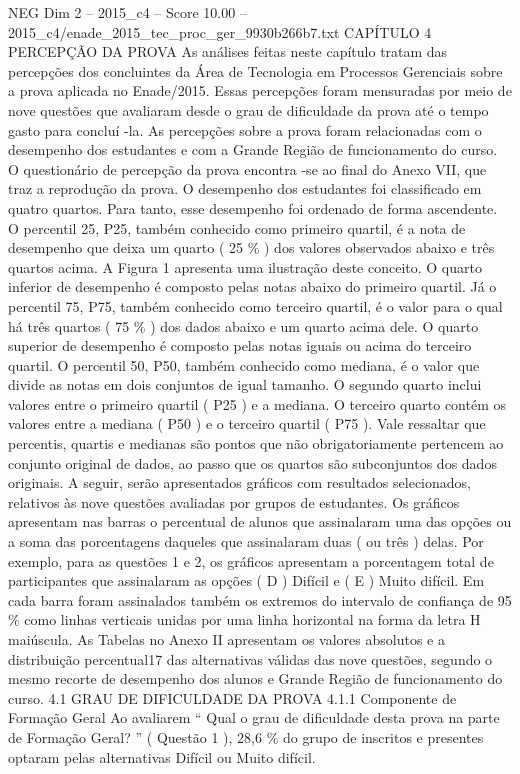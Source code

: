 \begin{textsample}{NEG Dim 2 – 2015\_c4 – Score 10.00 – 2015\_c4/enade\_2015\_tec\_proc\_ger\_9930b266b7.txt}  \label{ex:f2_neg_347}
CAPÍTULO 4 PERCEPÇÃO DA PROVA As análises feitas neste capítulo tratam das percepções dos concluintes da Área de Tecnologia em Processos Gerenciais sobre a prova aplicada no Enade/2015.
Essas percepções foram mensuradas por meio de nove questões que avaliaram desde o grau de dificuldade da prova até o tempo gasto para concluí -la.
As percepções sobre a prova foram relacionadas com o desempenho dos estudantes e com a Grande Região de funcionamento do curso.
O questionário de percepção da prova encontra -se ao final do Anexo VII, que traz a reprodução da prova.
O desempenho dos estudantes foi classificado em quatro quartos.
Para tanto, esse desempenho foi ordenado de forma ascendente.
O percentil 25, P25, também conhecido como primeiro quartil, é a nota de desempenho que deixa um quarto ( 25 \% ) dos valores observados abaixo e três quartos acima.
A Figura 1 apresenta uma ilustração deste conceito.
O quarto inferior de desempenho é composto pelas notas abaixo do primeiro quartil.
Já o percentil 75, P75, também conhecido como terceiro quartil, é o valor para o qual há três quartos ( 75 \% ) dos dados abaixo e um quarto acima dele.
O quarto superior de desempenho é composto pelas notas iguais ou acima do terceiro quartil.
O percentil 50, P50, também conhecido como mediana, é o valor que divide as notas em dois conjuntos de igual tamanho.
O segundo quarto inclui valores entre o primeiro quartil ( P25 ) e a mediana.
O terceiro quarto contém os valores entre a mediana ( P50 ) e o terceiro quartil ( P75 ).
Vale ressaltar que percentis, quartis e medianas são pontos que não obrigatoriamente pertencem ao conjunto original de dados, ao passo que os quartos são subconjuntos dos dados originais.
A seguir, serão apresentados gráficos com resultados selecionados, relativos às nove questões avaliadas por grupos de estudantes.
Os gráficos apresentam nas barras o percentual de alunos que assinalaram uma das opções ou a soma das porcentagens daqueles que assinalaram duas ( ou três ) delas.
Por exemplo, para as questões 1 e 2, os gráficos apresentam a porcentagem total de participantes que assinalaram as opções ( D ) Difícil e ( E ) Muito difícil.
Em cada barra foram assinalados também os extremos do intervalo de confiança de 95 \% como linhas verticais unidas por uma linha horizontal na forma da letra H maiúscula.
As Tabelas no Anexo II apresentam os valores absolutos e a distribuição percentual17 das alternativas válidas das nove questões, segundo o mesmo recorte de desempenho dos alunos e Grande Região de funcionamento do curso. 4.1 GRAU DE DIFICULDADE DA PROVA 4.1.1 Componente de Formação Geral Ao avaliarem “ Qual o grau de dificuldade desta prova na parte de Formação Geral? ” ( Questão 1 ), 28,6 \% do grupo de inscritos e presentes optaram pelas alternativas Difícil ou Muito difícil.

\end{textsample}
